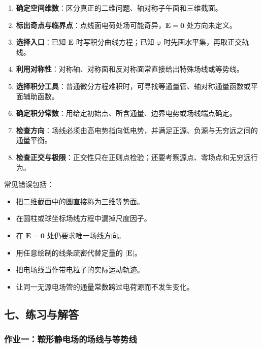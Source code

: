\begin{enumerate}
\def\labelenumi{\arabic{enumi}.}
\tightlist
\item
  \textbf{确定空间维数}：区分真正的二维问题、轴对称子午面和三维截面。
\item
  \textbf{标出奇点与临界点}：点线面电荷处场可能奇异，\(\mathbf E=\mathbf0\)
  处方向未定义。
\item
  \textbf{选择入口}：已知 \(\mathbf E\) 时写积分曲线方程；已知
  \(\varphi\) 时先画水平集，再取正交轨线。
\item
  \textbf{利用对称性}：对称轴、对称面和反对称面常直接给出特殊场线或等势线。
\item
  \textbf{选择积分工具}：普通微分方程难积时，可寻找等通量管、轴对称通量函数或平面辅助函数。
\item
  \textbf{确定积分常数}：用给定初始点、所含通量、边界电势或场线端点确定。
\item
  \textbf{检查方向}：场线必须由高电势指向低电势，并满足正源、负源与无穷远之间的通量平衡。
\item
  \textbf{检查正交与极限}：正交性只在正则点检验；还要考察源点、零场点和无穷远行为。
\end{enumerate}

常见错误包括：

\begin{itemize}
\tightlist
\item
  把二维截面中的圆直接称为三维等势面。
\item
  在圆柱或球坐标场线方程中漏掉尺度因子。
\item
  在 \(\mathbf E=\mathbf0\) 处仍要求唯一场线方向。
\item
  用任意绘制的线条疏密代替定量的 \(|\mathbf E|\)。
\item
  把电场线当作带电粒子的实际运动轨迹。
\item
  让同一无源电场管的通量常数跨过电荷源而不发生变化。
\end{itemize}

\subsection{七、练习与解答}\label{m2:ux4e03ux7ec3ux4e60ux4e0eux89e3ux7b54}

\subsubsection{作业一：鞍形静电场的场线与等势线}\label{m2:ux4f5cux4e1aux4e00ux978dux5f62ux9759ux7535ux573aux7684ux573aux7ebfux4e0eux7b49ux52bfux7ebf}

